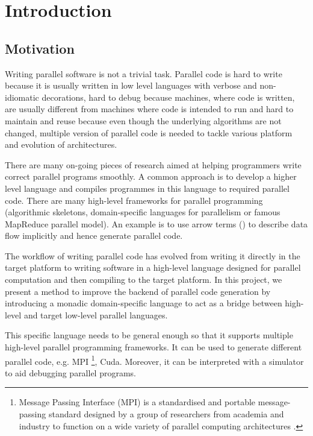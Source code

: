 \chapter{Introduction}
\section{Motivation} \label{i:m}
Writing parallel software is not a trivial task. Parallel code is hard to write because it is usually written in low level languages with verbose and non-idiomatic decorations, hard to debug because machines, where code is written, are usually different from machines where code is intended to run and hard to maintain and reuse because even though the underlying algorithms are not changed, multiple version of parallel code is needed to tackle various platform and evolution of architectures.

There are many on-going pieces of research aimed at helping programmers write correct parallel programs smoothly. A common approach is to develop a higher level language and compiles programmes in this language to required parallel code. There are many high-level frameworks for parallel programming (\eg algorithmic skeletons\cite{coleAlgorithmicSkeletonsStructured}, domain-specific languages for parallelism\cite{brownHeterogeneousParallelFramework2011} or famous MapReduce parallel model\cite{liMapReduceParallelProgramming2016}). An example is to use arrow terms () to describe data flow implicitly and hence generate parallel code.

The workflow of writing parallel code has evolved from writing it directly in the target platform to writing software in a high-level language designed for parallel computation and then compiling to the target platform. In this project, we present a method to improve the backend of parallel code generation by introducing a monadic domain-specific language to act as a bridge between high-level and target low-level parallel languages.

This specific language needs to be general enough so that it supports multiple high-level parallel programming frameworks. It can be used to generate different parallel code, e.g. MPI \footnote{Message Passing Interface (MPI) is a standardised and portable message-passing standard designed by a group of researchers from academia and industry to function on a wide variety of parallel computing architectures \cite{MessagePassingInterface2018}.}, Cuda. Moreover, it can be interpreted with a simulator to aid debugging parallel programs.

